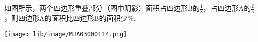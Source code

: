 如图所示，两个四边形重叠部分（图中阴影）面积占四边形B的$\frac{1}{8}$，占四边形A的$\frac{2}{5}$，则四边形A的面积比四边形B的面积少\key{\hspace{1cm}}$\%$．

\begin{center}

    \texttt{[image: lib/image/MJA03000114.png]}

\end{center}



